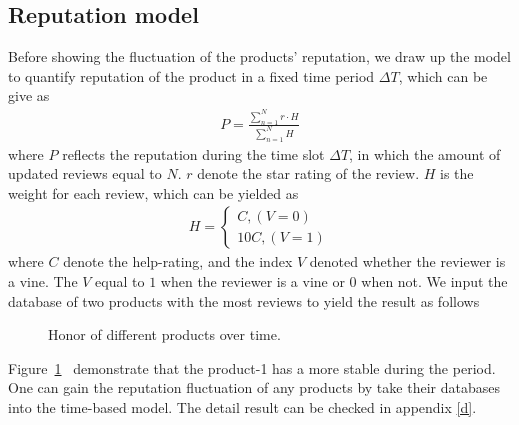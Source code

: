 \documentclass[12pt]{article}%
\begin{document}
\subsection{Reputation model}
Before showing the fluctuation of the products' reputation, we draw up the model to quantify reputation of the product in a fixed time period $\Delta T$, which can be give as
\begin{gather}
P=\frac{\sum_{n=1}^{N}r \cdot H}{\sum_{n=1}^{N} H}
\end{gather}
where  $P$ reflects the reputation during the time slot $\Delta T$, in which the amount of updated reviews equal to $N$. $r$ denote the star rating of the review. $H$ is the weight for each review, which can be yielded  as 
\begin{gather}
H=\left\{\begin{matrix}C ,(V=0)
\\ 10C,(V=1)
\end{matrix}\right.
\end{gather}
where $C$ denote the help-rating, and the index $V$ denoted whether the reviewer is a vine. The $V$ equal to $1$ when the reviewer is a vine or $0$ when not. We input the database of two products with the most reviews to yield the result as follows 
\begin{figure}[H]
	\centering
		\caption{Honor of different products over time.}
	\label{repu}
\end{figure}

Figure~\ref{repu}~ demonstrate that the product-1 has a more stable during the period. One can gain the reputation fluctuation of any products by take their databases into the time-based model.
The detail result can be checked in appendix \ref{d}.
\end{document}
